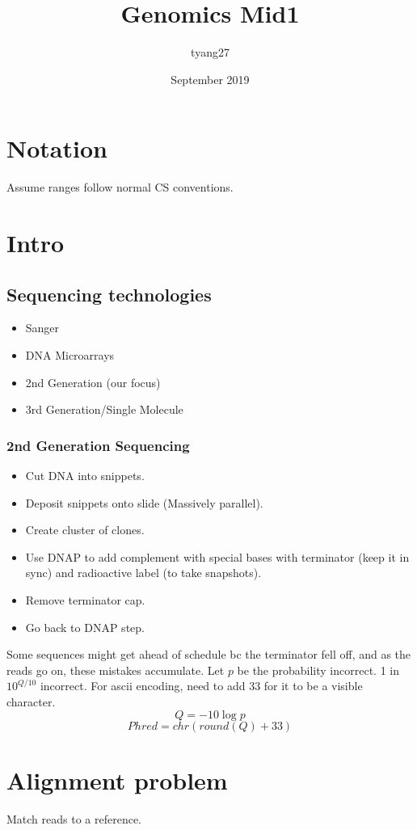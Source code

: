 \documentclass{article}
\title{Genomics Mid1}
\author{tyang27}
\date{September 2019}
\begin{document}
\maketitle

\section{Notation}
Assume ranges follow normal CS conventions.

\section{Intro}
\subsection{Sequencing technologies}
\begin{itemize}
    \itemsep 0em
    \item Sanger
    \item DNA Microarrays
    \item 2nd Generation (our focus)
    \item 3rd Generation/Single Molecule
\end{itemize}{}
\subsubsection{2nd Generation Sequencing}
\begin{itemize}
    \itemsep 0em
    \item Cut DNA into snippets.
    \item Deposit snippets onto slide (Massively parallel).
    \item Create cluster of clones.
    \item Use DNAP to add complement with special bases with terminator (keep it in sync) and radioactive label (to take snapshots).
    \item Remove terminator cap.
    \item Go back to DNAP step.
\end{itemize}
Some sequences might get ahead of schedule bc the terminator fell off, and as the reads go on, these mistakes accumulate.
Let $p$ be the probability incorrect. 1 in $10^{Q/10}$ incorrect. For ascii encoding, need to add 33 for it to be a visible character.
$$Q = -10\log p$$
$$Phred = chr(round(Q) + 33)$$

\section{Alignment problem}
Match reads to a reference.
\end{document}

